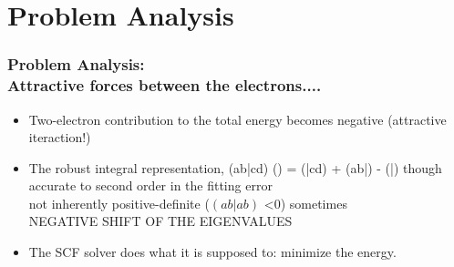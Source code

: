 



\section{Problem Analysis}
  \footnotesize
\begin{frame} 
   \frametitle{Problem Analysis:
     \\Attractive forces between the electrons....}
  \begin{itemize}
   \item Two-electron contribution to the total energy becomes negative ({\red attractive iteraction!})
   \item The robust integral representation, 
    \beq
    (ab|cd) \approx () = (|cd) + (ab|) - (|)
    \eeq
though accurate to second order in the fitting error
\\    {\red      not inherently positive-definite  ($(ab|ab)$ <0) sometimes 
\\NEGATIVE SHIFT OF THE EIGENVALUES }

   \item The SCF solver does what it is supposed to: minimize the energy.
   \end{itemize}
\end{frame}







